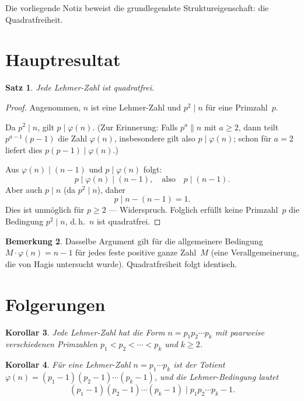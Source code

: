\documentclass[12pt,a4paper]{amsart}
\newtheorem{theorem}{Satz}[section]
\newtheorem{corollary}[theorem]{Korollar}
\theoremstyle{definition}
\newtheorem{remark}[theorem]{Bemerkung}
\newcommand{\euler}{\varphi}
\begin{document}
Die vorliegende Notiz beweist die grundlegendste Struktureigenschaft: die Quadratfreiheit.

\section{Hauptresultat}

\begin{theorem}
\label{thm:qfrei}
Jede Lehmer-Zahl ist quadratfrei.
\end{theorem}

\begin{proof}
Angenommen, $n$ ist eine Lehmer-Zahl und $p^2 \mid n$ für eine Primzahl~$p$.

Da $p^2 \mid n$, gilt $p \mid \euler(n)$.
(Zur Erinnerung: Falls $p^a \| n$ mit $a \ge 2$, dann teilt $p^{a-1}(p-1)$ die Zahl $\euler(n)$,
insbesondere gilt also $p \mid \euler(n)$; schon für $a = 2$ liefert dies $p(p-1) \mid \euler(n)$.)

Aus $\euler(n) \mid (n-1)$ und $p \mid \euler(n)$ folgt:
\[
  p \mid \euler(n) \mid (n-1), \quad \text{also} \quad p \mid (n-1).
\]
Aber auch $p \mid n$ (da $p^2 \mid n$), daher
\[
  p \mid n - (n-1) = 1.
\]
Dies ist unmöglich für $p \ge 2$ — Widerspruch.
Folglich erfüllt keine Primzahl~$p$ die Bedingung $p^2 \mid n$, d.\,h.\ $n$ ist quadratfrei.
\end{proof}

\begin{remark}
Dasselbe Argument gilt für die allgemeinere Bedingung $M \cdot \euler(n) = n - 1$
für jedes feste positive ganze Zahl~$M$ (eine Verallgemeinerung, die von Hagis \cite{Hagis1988}
untersucht wurde). Quadratfreiheit folgt identisch.
\end{remark}

\section{Folgerungen}

\begin{corollary}
Jede Lehmer-Zahl hat die Form $n = p_1 p_2 \cdots p_k$ mit paarweise verschiedenen
Primzahlen $p_1 < p_2 < \cdots < p_k$ und $k \ge 2$.
\end{corollary}

\begin{corollary}
Für eine Lehmer-Zahl $n = p_1 \cdots p_k$ ist der Totient
$\euler(n) = (p_1-1)(p_2-1)\cdots(p_k-1)$, und die Lehmer-Bedingung lautet
\[
  (p_1-1)(p_2-1)\cdots(p_k-1) \mid p_1 p_2 \cdots p_k - 1.
\]
\end{corollary}
\end{document}
